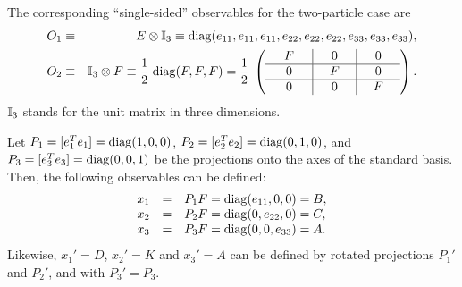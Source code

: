 \documentclass[12pt]{iopart}
\begin{document}
The corresponding ``single-sided'' observables for the two-particle case are
\begin{eqnarray}
O_1 &\equiv & E \otimes {\Bbb I}_3 \equiv
{\rm diag}(e_{11}, e_{11}, e_{11}, e_{22}, e_{22}, e_{22}, e_{33}, e_{33}, e_{33})
,
\\
O_2 &\equiv & {\Bbb I}_3 \otimes F \equiv
{1\over {2}} \;
{\rm diag}(F, F, F) =
{1\over {2}} \;
\left( \begin{array}{c|c|c} \quad F\quad &\quad 0\quad &\quad 0 \quad  \\\hline 0&F&0    \\ \hline 0&0&F \end{array} \right)
.
\end{eqnarray}
${\Bbb I}_3$ stands for the unit matrix in three dimensions.

Let
$P_1=[e_1^T e_1]={\rm diag}(1,0,0)$,
$P_2=[e_2^T e_2]={\rm diag}(0,1,0)$,
and
$P_3=[e_3^T e_3]={\rm diag}(0,0,1)$ be the projections
onto the  axes of the  standard basis.
Then, the following observables can be defined:
\begin{equation}
\begin{array}{lll}
x_1&=&P_1F={\rm diag}(e_{11},0,0)=B, \\
x_2&=&P_2F={\rm diag}(0,e_{22},0)=C,   \\
x_3&=&P_3F={\rm diag}(0,0,e_{33})=A.
\end{array}
\label{2004-analog-Epiover4b3pco}
\end{equation}
Likewise, $x_1'=D$, $x_2'=K$ and $x_3'=A$ can be defined
by  rotated projections $P_1'$ and $P_2'$, and with $P_3'=P_3$.
\end{document}
